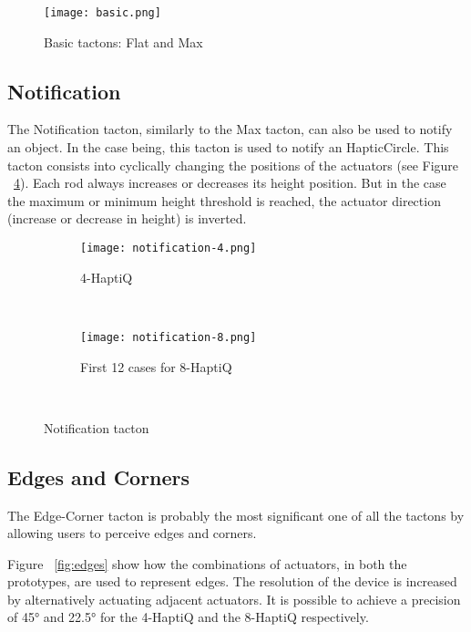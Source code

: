 \begin{figure}[H]
  \centering
  \texttt{[image: basic.png]}
  \caption{Basic tactons: Flat and Max}
  \label{fig:Basictactons}
\end{figure}

\subsection{Notification}
\label{sec:notification}

The Notification tacton, similarly to the Max tacton, can also be used to notify an object. In the case being, this tacton is used to notify an HapticCircle. This tacton consists into cyclically changing the positions of the actuators (see Figure ~\ref{fig:notification}). Each rod always increases or decreases its height position. But in the case the maximum or minimum height threshold is reached, the actuator direction (increase or decrease in height) is inverted.

\begin{figure}[H]
        \centering
        \begin{subfigure}[H]{0.7\textwidth}
                \texttt{[image: notification-4.png]}
                \caption{4-HaptiQ}
                \label{fig:notification-4}
        \end{subfigure}%
        ~ %
          
        \begin{subfigure}[H]{0.7\textwidth}
                \texttt{[image: notification-8.png]}
                \caption{First 12 cases for 8-HaptiQ}
                \label{fig:notification-8}
        \end{subfigure}
        ~ %
        \caption{Notification tacton}\label{fig:notification}
\end{figure}

\subsection{Edges and Corners}

The Edge-Corner tacton is probably the most significant one of all the tactons by allowing users to perceive edges and corners. 

Figure ~\ref{fig:edges} show how the combinations of actuators, in both the prototypes, are used to represent edges. The resolution of the device is increased by alternatively actuating adjacent actuators. It is possible to achieve a precision of 45° and 22.5° for the 4-HaptiQ and the 8-HaptiQ respectively. 

